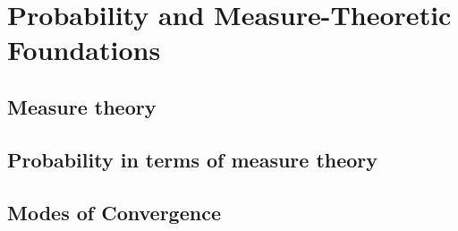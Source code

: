 
\section{Probability and Measure-Theoretic Foundations}

\subsection{Measure theory}











\subsection{Probability in terms of measure theory}










\subsection{Modes of Convergence}

